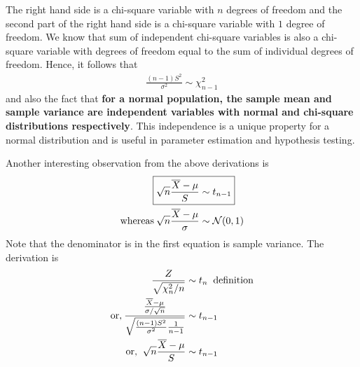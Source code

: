 \documentclass[../probability-notes.tex]{subfiles}
\begin{document}
    The right hand side is a chi-square variable with $n$ degrees of freedom and the second part of the right hand side is a chi-square variable with $1$ degree of freedom. We know that sum of independent chi-square variables is also a chi-square variable with degrees of freedom equal to the sum of individual degrees of freedom. Hence, it follows that
    \begin{align*}
        \frac{(n-1)S^{2}}{\sigma^{2}} \sim \chi_{n-1}^{2}
    \end{align*}
    and also the fact that \textbf{for a normal population, the sample mean and sample variance are independent variables with normal and chi-square distributions respectively}. This independence is a unique property for a normal distribution and is useful in parameter estimation and hypothesis testing.\newline

    Another interesting observation from the above derivations is
    \begin{align*}
        \Aboxed{\sqrt{n}\frac{\overline{X} - \mu}{S} &\sim t_{n-1}}\\
        \text{whereas\:} \sqrt{n}\frac{\overline{X} - \mu}{\sigma} &\sim \mathcal{N}(0,1)
    \end{align*}
    Note that the denominator is in the first equation is sample variance. The derivation is
    \begin{align*}
        \frac{Z}{\sqrt{\chi_{n}^{2}/n}} &\sim t_{n} \text{\: definition}\\
        \text{or,\:} \frac{\frac{\overline{X} - \mu}{\sigma / \sqrt{n}}}{\sqrt{\frac{(n-1)S^{2}}{\sigma^{2}} \frac{1}{n-1}}} &\sim t_{n-1}\\
        \text{or, \:} \sqrt{n}\frac{\overline{X} - \mu}{S} &\sim t_{n-1}
    \end{align*}
\end{document}
